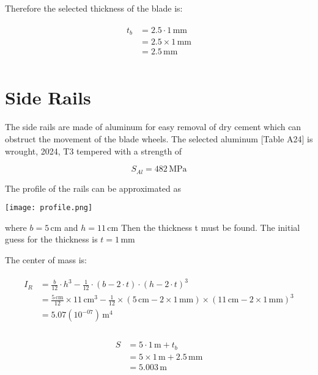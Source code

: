 \documentclass[11pt]{article}
\begin{document}
Therefore the selected thickness of the blade is:

\begin{align}
\begin{split}
t_{b}	&= 2.5 \cdot 1\,\mathrm{mm}\\
		&= 2.5 \times 1\,\mathrm{mm}\\
		&= 2.5\,\mathrm{mm}\\
\end{split}
\end{align}

\section{Side Rails}

The side rails are made of aluminum for easy removal of dry cement which can obstruct the movement of the blade wheels. The selected aluminum [Table A24] is wrought, 2024, T3 tempered with a strength of 

\begin{equation}
S_{Al}	= 482\,\mathrm{MPa}
\end{equation}

The profile of the rails can be approximated as

\texttt{[image: profile.png]}

where 
 $b = 5\,\mathrm{cm}$ and 
 $h = 11\,\mathrm{cm}$ Then the thickness t must be found. The initial guess for the thickness is
 $t = 1\,\mathrm{mm}$ 

The center of mass is:

\begin{align}
\begin{split}
I_{R}	&= \frac{b}{12} \cdot h^{3} - \frac{1}{12} \cdot \left(b - 2 \cdot t\right) \cdot \left(h - 2 \cdot t\right)^{3}\\
		&= \frac{5\,\mathrm{cm}}{12} \times 11\,\mathrm{cm}^{3} - \frac{1}{12} \times \left(5\,\mathrm{cm} - 2 \times 1\,\mathrm{mm}\right) \times \left(11\,\mathrm{cm} - 2 \times 1\,\mathrm{mm}\right)^{3}\\
		&= 5.07(10^{-07})\,\mathrm{m^{4}}\\
\end{split}
\end{align}

\begin{align}
\begin{split}
S	&= 5 \cdot 1\,\mathrm{m} + t_{b}\\
	&= 5 \times 1\,\mathrm{m} + 2.5\,\mathrm{mm}\\
	&= 5.003\,\mathrm{m}\\
\end{split}
\end{align}
\end{document}
